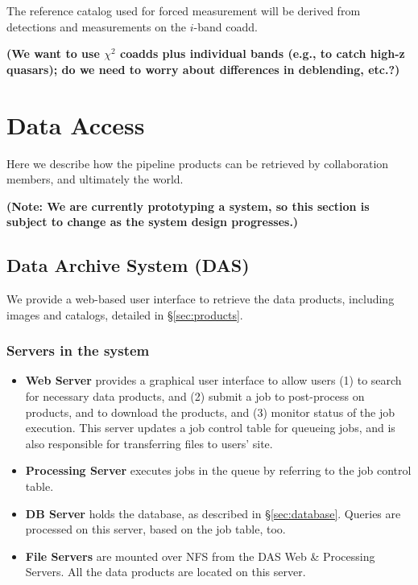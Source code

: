 \documentclass[12pt]{article}
\newcommand\tbd[1]{\textbf{\color{red}(#1)}}
\begin{document}
{The reference catalog used for forced measurement will be derived from detections and measurements on the
$i$-band coadd.

\tbd{We want to use $\chi^2$ coadds plus individual bands (e.g., to catch high-z quasars); do we need to worry
  about differences in deblending, etc.?}


\section{Data Access}
\label{sec:access}

Here we describe how the pipeline products can be retrieved by collaboration members, and ultimately the world.

\tbd{Note: We are currently prototyping a system, so this section is subject
  to change as the system design progresses.}

\subsection{Data Archive System (DAS)}
We provide a web-based user interface to retrieve the data products, including images and catalogs, detailed
in \S\ref{sec:products}.

\subsubsection{Servers in the system}
\begin{itemize}
\item {\bf Web Server} provides a graphical user interface to allow users 
(1) to search for necessary data products, and (2) submit a job to
post-process on products, and to download the products, and (3) monitor
status of the job execution. This server updates a job control table
for queueing jobs, and is also responsible for transferring files
to users' site.

\item {\bf Processing Server} executes jobs in the queue by
     referring to the job control table.

\item {\bf DB Server} holds the database, as described in \S\ref{sec:database}. Queries are processed on
  this server, based on the job table, too.

\item {\bf File Servers} are mounted over NFS from the DAS Web \&
     Processing Servers. All the data products are located on this
     server.
\end{itemize}

}
\end{document}

